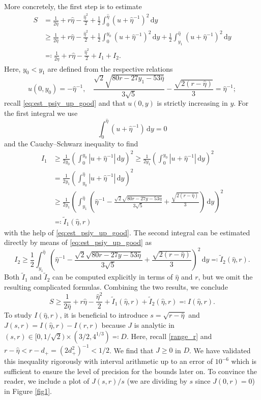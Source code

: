 \documentclass{amsart}
\theoremstyle{definition}
\newcommand{\dd}{\mathrm d}
\begin{document}
More concretely, the first step is to estimate
\begin{align*}
	S & = \frac{1}{2 \hat{\eta}} + r \hat{\eta} - \frac{\hat{\eta}^2}{2} + \frac12\int_0^{\hat{\eta}} (u + \hat{\eta}^{-1})^2 \, \dd y \\
	& \geq \frac{1}{2 \hat{\eta}} + r \hat{\eta} - \frac{\hat{\eta}^2}{2} + \frac12\int_0^{y_0} (u + \hat{\eta}^{-1})^2 \, \dd y + \frac12\int_{y_1}^{\hat{\eta}} (u + \hat{\eta}^{-1})^2 \, \dd y \\
	& \eqqcolon \frac{1}{2 \hat{\eta}} + r \hat{\eta} - \frac{\hat{\eta}^2}{2} + I_1 + I_2.
\end{align*}
Here, $y_0 < y_1$ are defined from the respective relations
\[
u(0,y_0) = -\hat\eta^{-1}, \quad \frac{\sqrt2\sqrt{80r-27y_1-53\hat\eta}}{3\sqrt5} - \frac{\sqrt{2(r-\hat\eta)}}{3} = \hat\eta^{-1};
\]
recall \eqref{eq:est_psiy_up_good} and that $u(0,y)$ is strictly increasing in $y$. For the first integral we use
\[\int_0^{\hat\eta} (u + \hat\eta^{-1})\, \dd y = 0\]
and the Cauchy--Schwarz inequality to find
\begin{align*}
	I_1 & \geq \frac{1}{2y_0} \left(\int_0^{y_0} |u + \hat{\eta}^{-1}| \, \dd y\right)^2 \geq \frac{1}{2y_1} \left(\int_0^{y_0} |u + \hat{\eta}^{-1}| \, \dd y\right)^2 \\
	&  = \frac{1}{2y_1} \left(\int_{y_0}^{\hat{\eta}} |u + \hat{\eta}^{-1}| \, \dd y\right)^2 \\
	&\geq  \frac{1}{2y_1} \left(\int_{y_1}^{\hat{\eta}} \left( \hat{\eta}^{-1} - \frac{\sqrt2\sqrt{80r-27y-53\hat\eta}}{3\sqrt5} + \frac{\sqrt{2(r-\hat\eta)}}{3} \right) \,\dd y\right)^2 \\
	& \eqqcolon \tilde I_1(\hat{\eta},r)
\end{align*}
with the help of \eqref{eq:est_psiy_up_good}. The second integral can be estimated directly by means of \eqref{eq:est_psiy_up_good} as
\[
I_2 \ge \frac{1}{2} \int_{y_1}^{\hat{\eta}} \left(\hat{\eta}^{-1} - \frac{\sqrt2\sqrt{80r-27y-53\hat\eta}}{3\sqrt5} + \frac{\sqrt{2(r-\hat\eta)}}{3}\right)^2\, \dd y \eqqcolon \tilde I_2(\hat{\eta},r).
\]
Both $\tilde I_1$ and $\tilde I_2$ can be computed explicitly in terms of $\hat\eta$ and $r$, but we omit the resulting complicated formulas. Combining the two results, we conclude
\[
S \geq \frac{1}{2 \hat{\eta}} + r \hat{\eta} - \frac{\hat{\eta}^2}{2} + \tilde I_1(\hat{\eta},r) + \tilde I_2(\hat{\eta},r) \eqqcolon I(\hat{\eta},r).
\]
To study $I(\hat\eta,r)$, it is beneficial to introduce $s=\sqrt{r-\hat\eta}$ and $J(s,r)=I(\hat\eta,r)-I(r,r)$ because $J$ is analytic in $(s,r)\in [0,1/\sqrt2)\times(3/2,4^{1/3})\eqqcolon D$. Here, recall \eqref{range_r} and $r-\hat\eta < r-d_+ = (2d_+^2)^{-1} < 1/2$. We find that $J\ge 0$ in $D$. We have validated this inequality rigorously with interval arithmetic up to an error of $10^{-6}$ which is sufficient to ensure the level of precision for the bounds later on. To convince the reader, we include a plot of $J(s,r)/s$ (we are dividing by $s$ since $J(0,r)=0$) in Figure \ref{fig1}.
\end{document}
